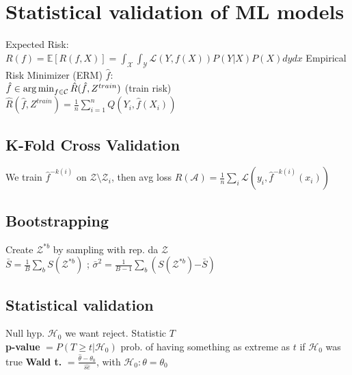 \section*{Statistical validation of ML models}
Expected Risk: $R(f) = \mathbb{E}[R(f, X)] =\int_\mathcal{X} \int_\mathcal{Y}\mathcal{L}(Y, f(X))P(Y|X)P(X)dydx $
Empirical Risk Minimizer (ERM) $\hat{f}$:\\
$\hat{f} \in \operatorname*{arg\,min}_{f \in \mathcal{C}} \hat{R}(\hat{f}, Z^{train})$ (train risk)\\
$\hat{R}(\hat{f}, Z^{train}) = \frac{1}{n} \sum_{i=1}^n Q(Y_i, \hat{f}(X_i))$\\

\subsection*{K-Fold Cross Validation}
We train $\hat{f}^{-k(i)}$ on $\mathcal{Z}\setminus\mathcal{Z}_i$, then avg loss
$R(\mathcal{A})=\frac1n \sum_i \mathcal{L}(y_i, \hat{f}^{-k(i)}(x_i))$
\subsection*{Bootstrapping}
Create $\mathcal{Z}^{*b}$ by sampling with rep. da $\mathcal{Z}$\\
$\bar{S}\mathrm{=}\frac1B\sum_bS(\mathcal{Z}^{*b})$ ;
$\bar{\sigma}^2\mathrm{=}\frac1{B-1}\sum_b(S(\mathcal{Z}^{*b})\mathrm{-}\bar{S})$

\subsection*{Statistical validation}
Null hyp. $\mathcal{H}_0$ we want reject. Statistic $T$ \\
\textbf{p-value} $= P(T\geq t | \mathcal{H}_0)$ prob. of having something as extreme as $t$ if $\mathcal{H}_0$ was true
\textbf{Wald t.} $= \frac{\hat{\theta}-\theta_0}{\widehat{se}}$, with $\mathcal{H}_0:\theta=\theta_0$